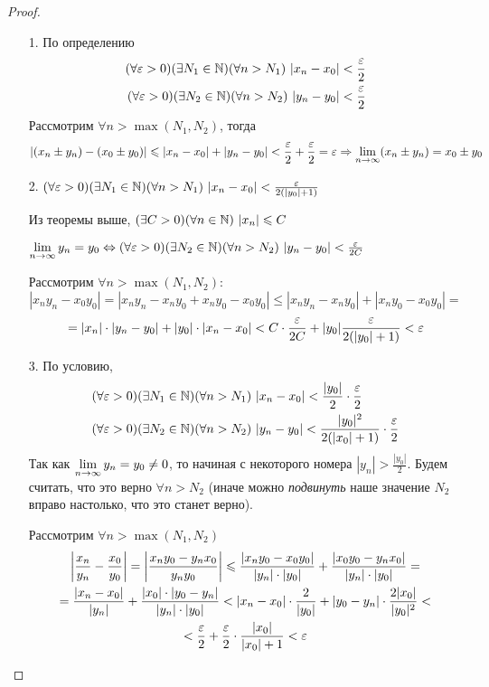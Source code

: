 \begin{proof}
\begin{enumerate}
    \item[1.] 
    По определению
    \begin{align*}
        (\forall \varepsilon > 0)(\exists N_1 \in \mathbb{N})(\forall n > N_1)
        \ |x_n - x_0| < \frac{\varepsilon}{2}
        \\
        (\forall \varepsilon > 0)(\exists N_2 \in \mathbb{N})(\forall n > N_2)
        \ |y_n - y_0| < \frac{\varepsilon}{2}
    \end{align*}
    Рассмотрим $\forall n > \max(N_1, N_2)$, тогда
    \[
        |(x_n \pm y_n) - (x_0 \pm y_0)| \leqslant |x_n - x_0| + |y_n - y_0|
        < \frac{\varepsilon}{2} + \frac{\varepsilon}{2} = \varepsilon \Rightarrow \lim\limits_{n \to \infty}
        (x_n \pm y_n) = x_0 \pm y_0
    \]

    \item[2.] 
    $(\forall \varepsilon > 0)(\exists N_1 \in \mathbb{N})(\forall n > N_1)
    \ |x_n - x_0| < \frac{\varepsilon}{2(|y_0| + 1)}$
    
    Из теоремы выше, $(\exists C > 0)(\forall n \in \mathbb{N})\ |x_n| \leqslant C$
    
    $\lim\limits_{n \to \infty} y_n = y_0 \Leftrightarrow (\forall \varepsilon > 0)
    (\exists N_2 \in \mathbb{N})(\forall n > N_2)\ |y_n - y_0|
    < \frac{\varepsilon}{2C}$
    
    Рассмотрим $\forall n > \max(N_1, N_2)$:
    \[
        |x_n y_n - x_0 y_0| = |x_n y_n - x_n y_0 + x_n y_0 - x_0 y_0|
        \le |x_n y_n - x_n y_0| + |x_n y_0 - x_0 y_0| =
    \]
    \[
        = |x_n| \cdot |y_n - y_0| + |y_0| \cdot |x_n - x_0| < C
        \cdot \frac{\varepsilon}{2C} + |y_0|\frac{\varepsilon}{2(|y_0| + 1)} < \varepsilon
    \]
    \item[3.]
    По условию,
    \begin{align*}
    	&(\forall \varepsilon > 0)(\exists N_1 \in \mathbb{N})(\forall n > N_1)
        \ |x_n - x_0| < \frac{|y_0|}{2} \cdot \frac{\varepsilon}{2}
    	\\
    	&(\forall \varepsilon > 0)(\exists N_2 \in \mathbb{N})(\forall n > N_2)
        \ |y_n - y_0| < \frac{|y_0|^2}{2(|x_0| + 1)} \cdot \frac{\varepsilon}{2}
    \end{align*}
    Так как $\lim\limits_{n \to \infty} y_n = y_0 \neq 0$, то
    начиная с некоторого номера $|y_n| > \frac{|y_0|}{2}$.
    Будем считать, что это верно $\forall n > N_2$
    (иначе можно \textit{подвинуть} наше значение $N_2$ вправо
    настолько, что это станет верно).
   	
    Рассмотрим $\forall n > \max(N_1, N_2)$
    \begin{multline*}
        \left|\frac{x_n}{y_n} - \frac{x_0}{y_0}\right| =
        \left|\frac{x_n y_0 - y_n x_0}{y_n y_0}\right| \leqslant
        \frac{|x_n y_0 - x_0 y_0|}{|y_n| \cdot |y_0|} +
        \frac{|x_0 y_0 - y_n x_0|}{|y_n| \cdot |y_0|} =
        \\
        = \frac{|x_n - x_0|}{|y_n|} + \frac{|x_0| \cdot
        |y_0 - y_n|}{|y_n| \cdot |y_0|} < |x_n - x_0|\cdot
        \frac{2}{|y_0|} + |y_0 - y_n| \cdot \frac{2|x_0|}{|y_0|^2} <
        \\
        < \frac{\varepsilon}{2} + \frac{\varepsilon}{2} \cdot \frac{|x_0|}{|x_0| + 1}
        < \varepsilon
    \end{multline*}
\end{enumerate}
\end{proof}